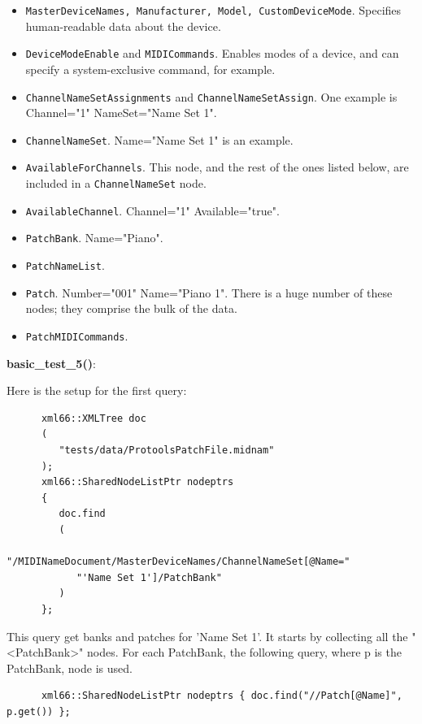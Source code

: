    \begin{itemize}
      \item \texttt{MasterDeviceNames, Manufacturer, Model, CustomDeviceMode}.
         Specifies human-readable data about the device.
      \item \texttt{DeviceModeEnable} and \texttt{MIDICommands}.
         Enables modes of a device, and can specify a system-exclusive command,
         for example.
      \item \texttt{ChannelNameSetAssignments} and
         \texttt{ChannelNameSetAssign}.
         One example is Channel="1" NameSet="Name Set 1".
		\item \texttt{ChannelNameSet}.
         Name="Name Set 1" is an example.
      \item \texttt{AvailableForChannels}.
         This node, and the rest of the ones listed below, are included in
         a \texttt{ChannelNameSet} node.
      \item \texttt{AvailableChannel}.
         Channel="1" Available="true".
      \item \texttt{PatchBank}.
         Name="Piano".
      \item \texttt{PatchNameList}.
      \item \texttt{Patch}.
         Number="001" Name="Piano 1". There is a huge number of these
         nodes; they comprise the bulk of the data.
      \item \texttt{PatchMIDICommands}.
   \end{itemize}

   \textbf{basic\_test\_5()}:

   Here is the setup for the first query:

   \begin{verbatim}
      xml66::XMLTree doc
      (
         "tests/data/ProtoolsPatchFile.midnam"
      );
      xml66::SharedNodeListPtr nodeptrs
      {
         doc.find
         (
            "/MIDINameDocument/MasterDeviceNames/ChannelNameSet[@Name="
            "'Name Set 1']/PatchBank"
         )
      };
   \end{verbatim}

   This query get banks and patches for 'Name Set 1'.
   It starts by collecting all the "<PatchBank>" nodes.
   For each PatchBank, the following query, where p is the PatchBank,
   node is used.

   \begin{verbatim}
      xml66::SharedNodeListPtr nodeptrs { doc.find("//Patch[@Name]", p.get()) };
   \end{verbatim}

